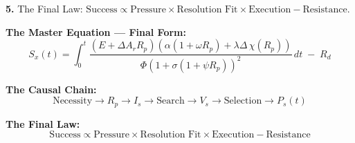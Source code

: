\documentclass[12pt, openany]{book}
\theoremstyle{thmstyle}
\theoremstyle{defstyle}
\begin{document}
\textbf{5.} The Final Law: $\text{Success} \propto \text{Pressure} \times \text{Resolution Fit} \times \text{Execution} - \text{Resistance}$.

\begin{equationbox}
\textbf{The Master Equation --- Final Form:}
\[
S_x(t) = \int_0^t
\frac{
(E + \Delta A_r R_p)
(\alpha(1+\omega R_p) + \lambda\Delta\,\chi(R_p))
}{
\Phi(1+\sigma(1+\psi R_p))^2
}
\, dt \; - \; R_d
\]

\textbf{The Causal Chain:}
\[
\text{Necessity} \to R_p \to I_s \to \text{Search} \to V_s \to \text{Selection} \to P_s(t)
\]

\textbf{The Final Law:}
\[
\text{Success} \propto \text{Pressure} \times \text{Resolution Fit} \times \text{Execution} - \text{Resistance}
\]
\end{equationbox}
\end{document}
